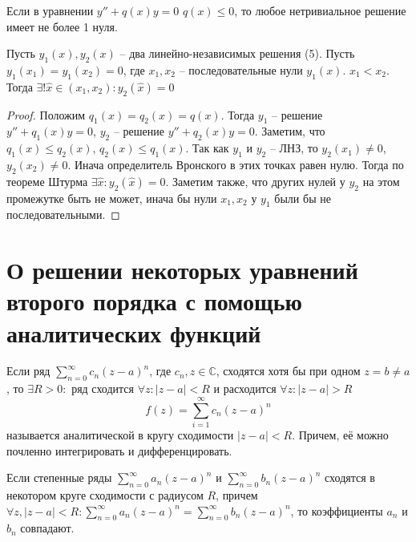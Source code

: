 \documentclass[document.tex]{subfiles}
\begin{document}
\begin{corollary}
    Если в уравнении $y'' + q(x)y = 0$ $q(x) \leq 0$, то любое нетривиальное решение имеет не более 1 нуля.
\end{corollary}

\begin{corollary}
    Пусть $y_1(x), y_2(x)$ -- два линейно-независимых решения (5). Пусть $y_1(x_1) = y_1(x_2) = 0$, где $x_1, x_2$ --
    последовательные нули $y_1(x)$. $x_1 < x_2$. Тогда $\exists ! \hat x \in (x_1, x_2): y_2(\hat x) = 0$
\end{corollary}

\begin{proof}
    Положим $q_1(x) = q_2(x) = q(x)$. Тогда $y_1$ -- решение $y'' + q_1(x)y = 0$, $y_2$ -- решение $y'' + q_2(x)y = 0$.
    Заметим, что $q_1(x) \leq q_2(x)$, $q_2(x) \leq q_1(x)$. Так как $y_1$ и $y_2$ -- ЛНЗ, то $y_2(x_1) \neq 0$,
    $y_2(x_2) \neq 0$. Инача определитель Вронского в этих точках равен нулю. Тогда по теореме Штурма $\exists \hat x:
    y_2(\hat x) = 0$. Заметим также, что других нулей у $y_2$ на этом промежутке быть не может, инача бы нули $x_1, x_2$
    у $y_1$ были бы не последовательными.
\end{proof}

\section{О решении некоторых уравнений второго порядка с помощью аналитических функций}

\begin{theorem}
    Если ряд $\sum_{n = 0}^{\infty} c_n (z - a)^n$, где $c_n, z \in \mathbb{C}$, сходятся хотя бы при одном $z = b \neq
    a$, то $\exists R > 0:$ ряд сходится $\forall z : |z - a| < R$ и расходится $\forall z : |z - a| > R$
    \[
        f(z) = \sum_{i = 1}^{\infty} c_n (z - a)^n
    \] называется аналитической в кругу сходимости $|z - a| < R$. Причем, её можно почленно интегрировать и
    дифференцировать.
\end{theorem}

\begin{theorem}[единственности]
    Если степенные ряды $\sum_{n = 0}^{\infty} a_n(z - a)^n$ и $\sum_{n = 0}^{\infty} b_n(z - a)^n$ сходятся в некотором
    круге сходимости с радиусом $R$, причем $\forall z, |z - a| < R: \sum_{n = 0}^{\infty} a_n (z - a)^n = \sum_{n = 0}^{\infty} b_n
    (z - a)^n$, то коэффициенты $a_n$ и $b_n$ совпадают.
\end{theorem}
\end{document}
